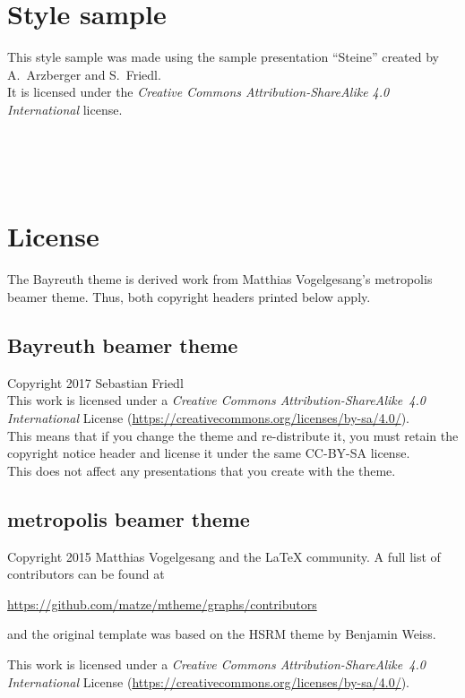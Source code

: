 \documentclass[12pt,a4paper]{scrartcl}
\begin{document}
	\section{Style sample}
	This style sample was made using the sample presentation \enquote{Steine} created by A.~Arzberger and S.~Friedl. \\
	It is licensed under the \textit{Creative Commons Attribution-ShareAlike 4.0 International} license.
	\begin{center}
		  \\
		  \\
		  \\
		 
	\end{center}

	
	\section{License}
	The Bayreuth theme is derived work from Matthias Vogelgesang's metropolis beamer theme. Thus, both copyright headers printed below apply.
	
	\subsection*{Bayreuth beamer theme}
	Copyright 2017 Sebastian Friedl \\
	This work is licensed under a \textit{Creative Commons Attribution-ShareAlike~4.0 International} License (\url{https://creativecommons.org/licenses/by-sa/4.0/}). \\
	This means that if you change the theme and re-distribute it, you must retain the copyright notice header and license it under the same CC-BY-SA license. \\
	This does not affect any presentations that you create with the theme.
	
	\subsection*{metropolis beamer theme}
	Copyright 2015 Matthias Vogelgesang and the LaTeX community. A full list of contributors can be found at
	\begin{center}
		\url{https://github.com/matze/mtheme/graphs/contributors}
	\end{center}
	and the original template was based on the HSRM theme by Benjamin Weiss.

	This work is licensed under a \textit{Creative Commons Attribution-ShareAlike~4.0 International} License (\url{https://creativecommons.org/licenses/by-sa/4.0/}).
\end{document}

